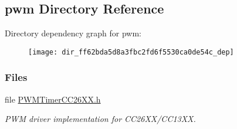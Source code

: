 \subsection{pwm Directory Reference}
\label{dir_ff62bda5d8a3fbc2fd6f5530ca0de54c}
Directory dependency graph for pwm\+:
\nopagebreak
\begin{figure}[H]
\begin{center}
\leavevmode
\texttt{[image: dir\_ff62bda5d8a3fbc2fd6f5530ca0de54c\_dep]}
\end{center}
\end{figure}
\subsubsection*{Files}
\begin{DoxyCompactItemize}
\item 
file \hyperlink{_p_w_m_timer_c_c26_x_x_8h}{P\+W\+M\+Timer\+C\+C26\+X\+X.\+h}
\begin{DoxyCompactList}\small\item\em P\+W\+M driver implementation for C\+C26\+X\+X/\+C\+C13\+X\+X. \end{DoxyCompactList}\end{DoxyCompactItemize}
